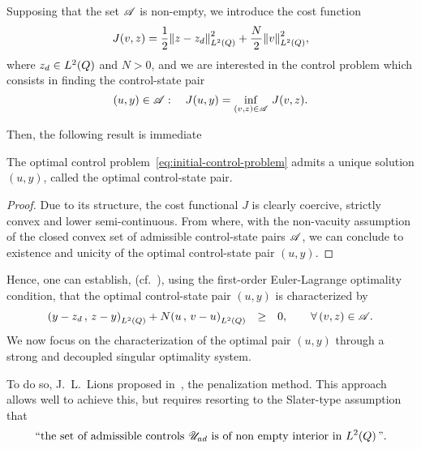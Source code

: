 Supposing that the set $\mathscr{A}$ is non-empty, we introduce the cost function
\begin{equation}\label{eq:initial-cost-function}
    J(v,z) = \dfrac{1}{2}{\left\|{z - z_{d} }\right\|}_{L^{2}\left({Q}\right)}^{2} + \dfrac{N}{2}{\left\|{v }\right\|}_{L^{2}\left({Q}\right)}^{2},
\end{equation}
where $z_{d}\in L^{2}\!\left({Q}\right)$ and $N > 0$, and we are interested in the control
problem which consists in finding the control-state pair
\begin{equation}\label{eq:initial-control-problem}
    (u,y)\in\mathscr{A}:\quad J(u,y) = \inf_{(v,z)\in \mathscr{A}}\,J(v,z).
\end{equation}

Then, the following result is immediate
\begin{theoreme}%
    The optimal control problem~\eqref{eq:initial-control-problem} admits a
    unique solution $(u,y)$, called the optimal control-state pair.
\end{theoreme}

\begin{proof}%
    Due to its structure, the cost functional $J$ is clearly coercive,
    strictly convex and lower semi-continuous. From where, with the
    non-vacuity assumption of the closed convex set of admissible
    control-state pairs $\mathscr{A}$, we can conclude to existence and unicity
    of the optimal control-state pair $(u,y)$.
\end{proof}

Hence, one can establish, (cf.~\cite{lions2}), using the first-order
Euler-Lagrange optimality condition, that the optimal control-state pair
$(u,y)$ is characterized by
\begin{equation*}\label{eq:initial-variational-inequation}
    \begin{array}{rcl}
        \scalaireq{%
            y - z_{d}
        }{%
            z - y
        } + N\scalaireq{u}{v - u} & \geq & 0,\qquad \forall\,(v,z)\in\Ascr.
    \end{array}
\end{equation*}
We now focus on the characterization of the optimal pair $(u,y)$ through a
strong and decoupled singular optimality system.

To do so, J.~L.~Lions proposed in~\cite{lions2}, the penalization method.
This approach allows well to achieve this, but requires resorting to the
Slater-type assumption that
\begin{equation}\label{eq:slater-type-assumption}
    \text{“the set of admissible controls }{\mathscr{U}}_{ad}\ \text{is of non
    empty interior in}\ L^{2}\!\left({Q}\right)\text{”}.
\end{equation}

